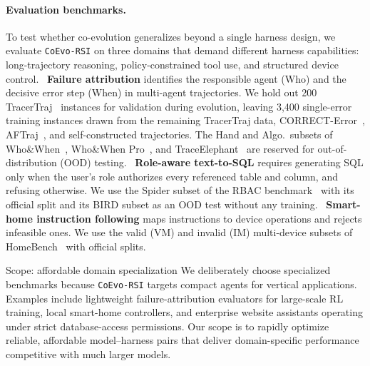 \documentclass[11pt,a4paper]{article}
\newcommand{\ourmethod}{\texttt{CoEvo-RSI}}
\begin{document}
\paragraph{Evaluation benchmarks.}
To test whether co-evolution generalizes beyond a single harness design, we evaluate \ourmethod{} on three domains that demand different harness capabilities: long-trajectory reasoning, policy-constrained tool use, and structured device control. ~\textbf{Failure attribution} identifies the responsible agent (Who) and the decisive error step (When) in multi-agent trajectories. We hold out 200 TracerTraj~\citep{zhang2025agentracer} instances for validation during evolution, leaving 3,400 single-error training instances drawn from the remaining TracerTraj data, CORRECT-Error~\citep{yu2026correct}, AFTraj~\citep{zhang2026agentforesight}, and self-constructed trajectories. The Hand and Algo.\ subsets of Who\&When~\citep{zhang2025agentcausestaskfailures}, Who\&When Pro~\citep{liu2026whowhenprollmsreally}, and TraceElephant~\citep{chen2026seeingelephantbenchmarkfailure} are reserved for out-of-distribution (OOD) testing. ~\textbf{Role-aware text-to-SQL} requires generating SQL only when the user's role authorizes every referenced table and column, and refusing otherwise. We use the Spider subset of the RBAC benchmark~\citep{fei2026benchmarkingtexttosqlrolebasedaccess} with its official split and its BIRD subset as an OOD test without any training. ~\textbf{Smart-home instruction following} maps instructions to device operations and rejects infeasible ones. We use the valid (VM) and invalid (IM) multi-device subsets of HomeBench~\citep{li2025homebenchevaluatingllmssmart} with official splits.

\begin{insightbox}{Scope: affordable domain specialization}
We deliberately choose specialized benchmarks because \ourmethod{} targets compact agents for vertical applications.
Examples include lightweight failure-attribution evaluators for large-scale RL training, local smart-home controllers, and enterprise website assistants operating under strict database-access permissions.
Our scope is to rapidly optimize reliable, affordable model--harness pairs that deliver domain-specific performance competitive with much larger models.
\end{insightbox}
\end{document}
